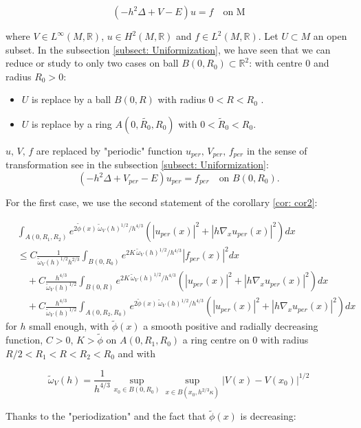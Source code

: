 \documentclass[leqno,11pt,letterpaper, english]{amsart}
\newcommand{\nn}{\nonumber}
\theoremstyle{plain}
\theoremstyle{definition}
\numberwithin{equation}{section}
\def\R{\mathbb R}
\begin{document}
\begin{equation}
(-h^2\Delta +V-E)u=f \quad \mbox{on M}
\end{equation}

where  $V\in L^\infty(M,\R)$, $u\in H^2(M,\R)$ and $f\in L^2(M,\R)$. Let $U\subset M$ an open subset.
In the subsection \ref{subsect: Uniformization}, we have seen that we can reduce or study to only two cases on ball $B(0,R_0)\subset \R^2$: with centre $0$ and radius $R_0>0$:
\begin{itemize}
	\item $U$ is replace by a ball $B(0,R)$ with radius $0<R<R_0$ .
	\item $U$ is replace by a ring $A(0,\tilde{R_0},R_0)$ with $0<\tilde{R}_0<R_0$.
\end{itemize}
$u,\,V,\,f$ are replaced by "periodic" function  $u_{per},\, V_{per},\, f_{per}$ in the sense of transformation see in the subsection \ref{subsect: Uniformization}:
$$(-h^2\Delta +V_{per}-E)u_{per}=f_{per} \quad \mbox{on } B(0,R_0).$$

For the first case, we use the second statement of the corollary \ref{cor: cor2}:

\begin{align}
   &\int_{A(0,R_1,R_2)} e^{2\tilde{\phi}(x)\,\tilde{\omega}_V(h)^{1/2}/ h^{4/3}} (|u_{per}(x)|^2 +|h\nabla_x u_{per}(x)|^2)dx\nn\\
   &\leq C \frac{1}{\tilde{\omega}_V(h)^{1/2}h^{2/3}}\int_{B(0,R_0)} e^{2K\,\tilde{\omega}_V(h)^{1/2}/ h^{4/3}}|f_{per}(x)|^2dx\nn\\
   &\quad + C \frac{h^{4/3}}{\tilde{\omega}_V(h)^{1/2}}\int_{B(0,R)} e^{2K\,\tilde{\omega}_V(h)^{1/2}/ h^{4/3}} (|u_{per}(x)|^2 +|h\nabla_x u_{per}(x)|^2)dx\nn\\
   &\quad +C \frac{h^{4/3}}{\tilde{\omega}_V(h)^{1/2}}\int_{A(0,R_2,R_0)} e^{2\tilde{\phi}(x)\,\tilde{\omega}_V(h)^{1/2}/ h^{4/3}} (|u_{per}(x)|^2 +|h\nabla_x u_{per}(x)|^2)dx
\end{align}
 for $h$ small enough, with $\tilde{\phi}(x)$ a smooth positive and radially decreasing function, $C>0$, $K>\tilde{\phi}$ on $A(0,R_1,R_0)$ a ring centre on $0$ with radius $R/2<R_1<R<R_2<R_0$ and
with

\begin{equation}
\tilde{\omega}_V(h)= \frac{1}{h^{4/3}}\sup_{x_0\in B(0,R_0)}\sup_{x\in B(x_0,h^{2/3}\kappa)}|V(x)-V(x_0)|^{1/2}
\end{equation}

Thanks to the "periodization" and the fact that $\tilde{\phi}(x)$ is decreasing:
\end{document}

